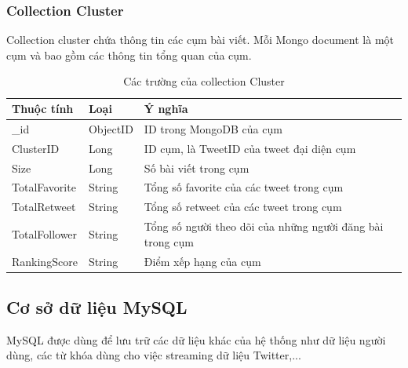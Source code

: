 		\subsubsection{Collection Cluster}
		Collection cluster chứa thông tin các cụm bài viết. Mỗi Mongo document là một cụm và bao gồm các thông tin tổng quan của cụm.
		\begin{table}[H]
			\setlength\extrarowheight{3pt}
			\begin{tabular}{|l|l|p{9cm}|}
				\hline
				\textbf{Thuộc tính}     & \textbf{Loại} & \textbf{Ý nghĩa} \\\hline
				\_id           & ObjectID       &  ID trong MongoDB của cụm\\\hline
				ClusterID      & Long           &  ID cụm, là TweetID của tweet đại diện cụm\\\hline
				Size	       & Long           &  Số bài viết trong cụm\\\hline
				TotalFavorite	& String         & Tổng số favorite của các tweet trong cụm\\\hline
				TotalRetweet	& String         & Tổng số retweet của các tweet trong cụm\\\hline
				TotalFollower	& String         & Tổng số người theo dõi của những người đăng bài trong cụm\\\hline
				RankingScore	& String         & Điểm xếp hạng của cụm\\\hline
				
			\end{tabular}%
			\caption{Các trường của collection Cluster}
			\label{tab:table_3_3}%
		\end{table}%

	\subsection{Cơ sở dữ liệu MySQL}
	MySQL được dùng để lưu trữ các dữ liệu khác của hệ thống như dữ liệu người dùng, các từ khóa dùng cho việc streaming dữ liệu Twitter,...
